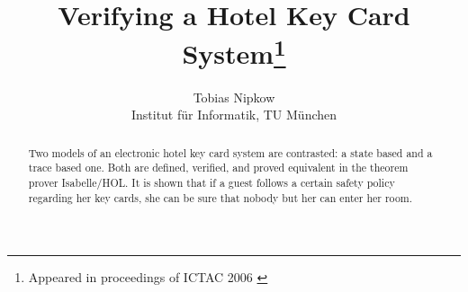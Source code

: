 \documentclass[a4paper]{article}
\begin{document}
\title{Verifying a Hotel Key Card System\thanks{Appeared in proceedings of ICTAC 2006 \cite{Nipkow-ICTAC06}}}
\author{Tobias Nipkow\\ Institut f\"ur Informatik, TU M\"unchen}
\maketitle

\begin{abstract}
Two models of an electronic hotel key card system are contrasted: a
state based and a trace based one. Both are defined, verified, and
proved equivalent in the theorem prover Isabelle/HOL. It is shown that
if a guest follows a certain safety policy regarding her key cards,
she can be sure that nobody but her can enter her room.
\end{abstract}







\end{document}
